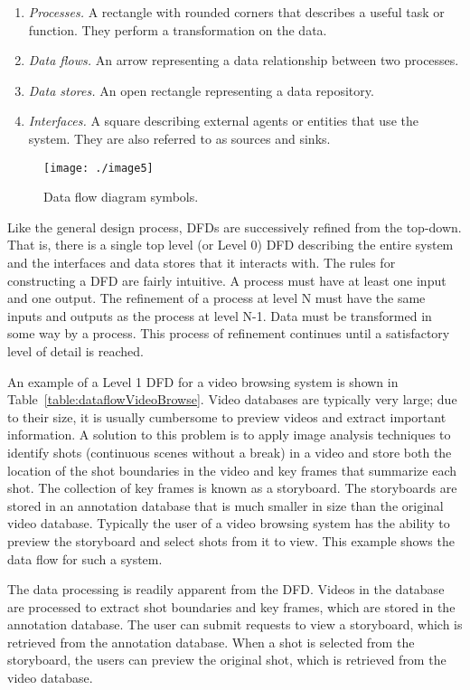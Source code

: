 \begin{enumerate}
\def\labelenumi{\arabic{enumi}.}
\item
  \emph{Processes.} A rectangle with rounded corners that describes a
  useful task or function. They perform a transformation on the data.
\item
  \emph{Data flows.} An arrow representing a data relationship between
  two processes.
\item
  \emph{Data stores.} An open rectangle representing a data repository.
\item
  \emph{Interfaces.} A square describing external agents or entities
  that use the system. They are also referred to as sources and sinks.
\end{enumerate}


\begin{figure}[h]
\centering
\texttt{[image: ./image5]}
\caption{Data flow diagram symbols.}
\label{figure:dataFlowSymbols}
\end{figure}


Like the general design process, DFDs are successively refined from the
top-down. That is, there is a single top level (or Level 0) DFD
describing the entire system and the interfaces and data stores that it
interacts with. The rules for constructing a DFD are fairly intuitive. A
process must have at least one input and one output. The refinement of a
process at level N must have the same inputs and outputs as the process
at level N-1. Data must be transformed in some way by a process. This
process of refinement continues until a satisfactory level of detail is
reached.

An example of a Level 1 DFD for a video browsing system is shown in
Table~\ref{table:dataflowVideoBrowse}. Video databases are typically 
very large; due to their size,
it is usually cumbersome to preview videos and extract important
information. A solution to this problem is to apply image analysis
techniques to identify shots (continuous scenes without a break) in a
video and store both the location of the shot boundaries in the video
and key frames that summarize each shot. The collection of key frames is
known as a storyboard. The storyboards are stored in an annotation
database that is much smaller in size than the original video database.
Typically the user of a video browsing system has the ability to preview
the storyboard and select shots from it to view. This example shows the
data flow for such a system.

The data processing is readily apparent from the DFD. Videos in the
database are processed to extract shot boundaries and key frames, which
are stored in the annotation database. The user can submit requests to
view a storyboard, which is retrieved from the annotation database. When
a shot is selected from the storyboard, the users can preview the
original shot, which is retrieved from the video database.

